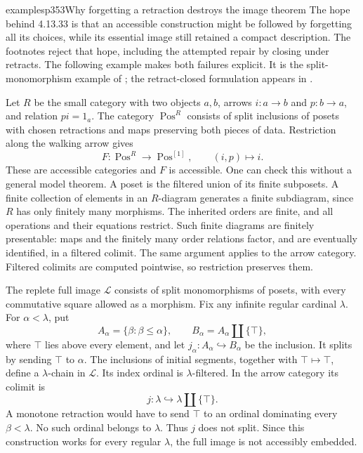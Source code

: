 \begin{dcomment}{examples}{p353}{Why forgetting a retraction destroys the image theorem}
The hope behind 4.13.33 is that an accessible construction might be followed by forgetting all its choices, while its essential image still retained a compact description. The footnotes reject that hope, including the attempted repair by closing under retracts. The following example makes both failures explicit. It is the split-monomorphism example of \citet[Example 3.5(1), author manuscript]{Rosicky2009Combinatorial}; the retract-closed formulation appears in \citet[Remark 3.3(2), accepted version]{BrookeTaylorRosicky2017}.

Let $R$ be the small category with two objects $a,b$, arrows $i:a\to b$ and $p:b\to a$, and relation $pi=1_a$. The category $\operatorname{Pos}^{R}$ consists of split inclusions of posets with chosen retractions and maps preserving both pieces of data. Restriction along the walking arrow gives
\[
 F:\operatorname{Pos}^{R}\longrightarrow
       \operatorname{Pos}^{[1]},\qquad (i,p)\longmapsto i.
\]
These are accessible categories and $F$ is accessible. One can check this without a general model theorem. A poset is the filtered union of its finite subposets. A finite collection of elements in an $R$-diagram generates a finite subdiagram, since $R$ has only finitely many morphisms. The inherited orders are finite, and all operations and their equations restrict. Such finite diagrams are finitely presentable: maps and the finitely many order relations factor, and are eventually identified, in a filtered colimit. The same argument applies to the arrow category. Filtered colimits are computed pointwise, so restriction preserves them.

The replete full image $\mathcal L$ consists of split monomorphisms of posets, with every commutative square allowed as a morphism. Fix any infinite regular cardinal $\lambda$. For $\alpha<\lambda$, put
\[
 A_\alpha=\{\beta:\beta\leq\alpha\},\qquad
 B_\alpha=A_\alpha\amalg\{\top\},
\]
where $\top$ lies above every element, and let $j_\alpha:A_\alpha\hookrightarrow B_\alpha$ be the inclusion. It splits by sending $\top$ to $\alpha$. The inclusions of initial segments, together with $\top\mapsto\top$, define a $\lambda$-chain in $\mathcal L$. Its index ordinal is $\lambda$-filtered. In the arrow category its colimit is
\[
 j:\lambda\hookrightarrow\lambda\amalg\{\top\}.
\]
A monotone retraction would have to send $\top$ to an ordinal dominating every $\beta<\lambda$. No such ordinal belongs to $\lambda$. Thus $j$ does not split. Since this construction works for every regular $\lambda$, the full image is not accessibly embedded.


\end{dcomment}

